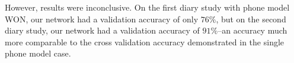 However, results were inconclusive. On the first diary study with phone model WON, our network
had a validation accuracy of only $76\%$, but on the second diary study, our network had a validation
accuracy of $91\%$--an accuracy much more comparable to the cross validation accuracy
demonstrated in the single phone model case. 
